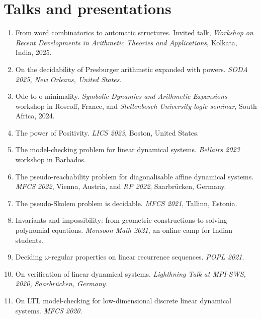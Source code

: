 \documentclass{article}
\begin{document}
      

    
	\section*{Talks and presentations}
	\begin{enumerate}
            \item From word combinatorics to automatic structures. Invited talk, \emph{Workshop on Recent Developments in Arithmetic Theories and Applications}, Kolkata, India, 2025.
            \item On the decidability of Presburger arithmetic expanded with powers. \emph{SODA 2025, New Orleans, United States.}
		\item Ode to o-minimality. \emph{Symbolic Dynamics and Arithmetic Expansions} workshop in Roscoff, France, and \emph{Stellenbosch University logic seminar}, South Africa, 2024.
		\item The power of Positivity. \emph{LICS 2023}, Boston, United States.
		\item The model-checking problem for linear dynamical systems. \emph{Bellairs 2023} workshop in Barbados.
		\item The pseudo-reachability problem for diagonalisable affine dynamical systems. \emph{MFCS 2022}, Vienna, Austria, and \emph{RP 2022}, Saarbr\"ucken, Germany.
		\item The pseudo-Skolem problem is decidable. \emph{MFCS 2021}, Tallinn, Estonia.
		\item Invariants and impossibility: from geometric constructions to solving polynomial equations. \emph{Monsoon Math 2021}, an online camp for Indian students.
		\item Deciding $\omega$-regular properties on linear recurrence sequences. \emph{POPL 2021}.
		\item On verification of linear dynamical systems. \emph{Lighthning Talk at MPI-SWS, 2020, Saarbr\"ucken, Germany.}
		\item  On LTL model-checking for low-dimensional discrete
		linear dynamical systems. \emph{MFCS 2020}.
	\end{enumerate}
\end{document}

